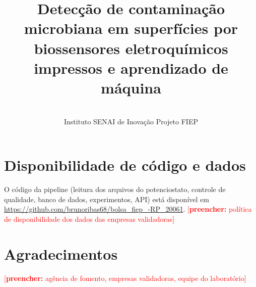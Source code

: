 \documentclass[11pt,a4paper]{article}
\title{Detecção de contaminação microbiana em superfícies por biossensores
eletroquímicos impressos e aprendizado de máquina}
\author{\preencher{autores e afiliações}\\
\small Instituto SENAI de Inovação \preencher{unidade} \quad
\small Projeto FIEP}
\date{}
\newcommand{\preencher}[1]{\textcolor{red}{[\textbf{preencher:} #1]}}
\begin{document}
\maketitle








\section*{Disponibilidade de código e dados}
O código da pipeline (leitura dos arquivos do potenciostato, controle de qualidade, banco de dados,
experimentos, API) está disponível em
\url{https://github.com/brunoribas68/bolsa_fiep_-RP_20061}. \preencher{política de disponibilidade dos dados das empresas validadoras}

\section*{Agradecimentos}
\preencher{agência de fomento, empresas validadoras, equipe do laboratório}



\end{document}
